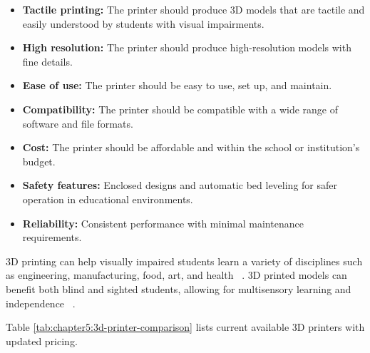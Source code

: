 \begin{itemize}

    \item \textbf{Tactile printing:} The printer should produce 3D models that are tactile and easily understood by students with visual impairments.

    \item \textbf{High resolution:} The printer should produce high-resolution models with fine details.

    \item \textbf{Ease of use:} The printer should be easy to use, set up, and maintain.

    \item \textbf{Compatibility:} The printer should be compatible with a wide range of software and file formats.

    \item \textbf{Cost:} The printer should be affordable and within the school or institution's budget.

    \item \textbf{Safety features:} Enclosed designs and automatic bed leveling for safer operation in educational environments.

    \item \textbf{Reliability:} Consistent performance with minimal maintenance requirements.

\end{itemize}


3D printing can help visually impaired students learn a variety of disciplines such as engineering, manufacturing, food, art, and health~ \cite{Karbowski2020}. 3D printed models can benefit both blind and sighted students, allowing for multisensory learning and independence~ \cite{MatterHackers2017}.

Table \ref{tab:chapter5:3d-printer-comparison} lists current available 3D printers with updated pricing.

